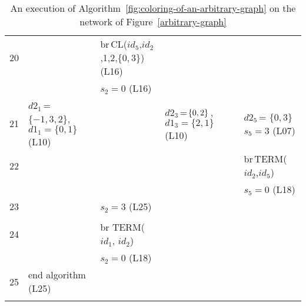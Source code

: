 \documentclass[11pt,english]{article}
\begin{document}
\begin{table}[h]
\begin{tabular}{|p{0.66cm}|p{2.7cm}|p{3.4cm}|p{2.95 cm}|p{2.46cm}|p{1.93cm}|}
20 & &  br\,CL($id_5$,$id_2$,1,2,$\lbrace 0,3\rbrace$)\,(L16)  &  &   &  \\
& & $s_2 = 0$ (L16) & &  &  \\\hline

21 & $d2_1$\,=\,\,$\lbrace -1,3,2\rbrace$, $d1_1 = \lbrace 0, 1 \rbrace$ (L10) &  & $d2_3$\,=\,\,$\hspace{-3 pt}\lbrace 0,2\rbrace$\,,\, \hspace{20 pt} $d1_3 = \lbrace 2,1\rbrace$ (L10) &   & \hspace{-5 pt}$d2_5$\,=\,\,$\lbrace 0, 3\rbrace$ \hspace{-1 pt} $s_5 = 3$ (L07)  \\\hline


22 & &  &  &   & \hspace{-0.27 cm }  br\,TERM($id_2$,$id_5$) \\
& & & &  & \hspace{-8 pt} $s_5 = 0$ (L18) \\\hline

23 & &  $s_2 = 3$ (L25) &  &   &  \\
& & & &  & \\\hline

24 & &  br TERM($id_1$,  $id_2$)  &  &   &  \\
& & $s_2 = 0$ (L18) & &  & \\\hline

25 & end algorithm (L25) &    &  &   &  \\
& & & &  & \\\hline

\end{tabular}
\caption{An execution of Algorithm~\ref{fig:coloring-of-an-arbitrary-graph}
on the network of Figure~\ref{arbitrary-graph}}
\label{fig:table-example}
\end{table}
\end{document}
